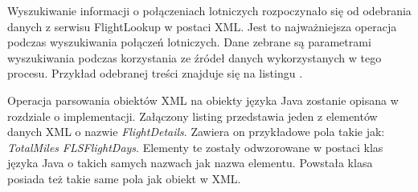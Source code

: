 \documentclass[12pt, twoside]{report}
\begin{document}
Wyszukiwanie informacji o połączeniach lotniczych rozpoczynało się od odebrania danych z serwisu FlightLookup w postaci XML. Jest to najważniejsza operacja podczas  wyszukiwania połączeń lotniczych. Dane zebrane  są parametrami wyszukiwania podczas korzystania ze źródeł danych wykorzystanych w  tego procesu. Przykład odebranej treści znajduje się na listingu . 

Operacja parsowania obiektów XML na obiekty języka Java zostanie  opisana w rozdziale o implementacji. Załączony listing  przedstawia jeden z elementów danych XML o nazwie \textit{FlightDetails}. Zawiera on przykładowe pola takie jak: \textit{TotalMiles}  \textit{FLSFlightDays}. Elementy te zostały odwzorowane w postaci klas języka Java o takich samych nazwach jak nazwa elementu. Powstała klasa posiada też takie same pola jak obiekt w XML.
\end{document}
